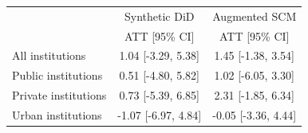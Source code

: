 \begin{tabular}{lcc}
\hline
 & Synthetic DiD & Augmented SCM \\
 & ATT [95\% CI] & ATT [95\% CI] \\
\hline
All institutions & 1.04 [-3.29, 5.38] & 1.45 [-1.38, 3.54] \\
Public institutions & 0.51 [-4.80, 5.82] & 1.02 [-6.05, 3.30] \\
Private institutions & 0.73 [-5.39, 6.85] & 2.31 [-1.85, 6.34] \\
Urban institutions & -1.07 [-6.97, 4.84] & -0.05 [-3.36, 4.44] \\
\hline
\end{tabular}
